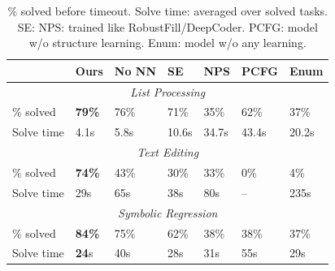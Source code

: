 \documentclass{article}
\newcommand{\expect}{\mathds{E}} %
\newcommand{\probability}{\mathds{P}} %
\begin{document}
\begin{table}
\tabcolsep=4pt
\renewcommand{\arraystretch}{0.5}
\begin{tabular}{lllllll}
  \toprule& Ours& 
    No NN
& SE&NPS & PCFG & Enum



  \\\midrule\multicolumn{7}{c}{\emph{List Processing}}\\\midrule
  \% solved&\textbf{79\%} &76\% &71\%&35\%&62\%&37\%\\
  Solve time&  4.1s&5.8s&10.6s&34.7s&43.4s&20.2s

  \\\midrule\multicolumn{7}{c}{\emph{Text Editing}}\\\midrule
  \% solved&\textbf{74\%} &43\% &30\%&33\%&0\%&4\%\\
  Solve time&  29s&65s&38s&80s&--&235s


  \\\midrule\multicolumn{7}{c}{\emph{Symbolic Regression}}\\\midrule
  \% solved&   \textbf{84\% }&75\%&62\%&38\%&38\%&37\% \\
  Solve time&  \textbf{24}s& 40s  &28s&31s&55s&29s

  \\\bottomrule
  \end{tabular}
\caption{\% solved before timeout. Solve time: averaged over solved
  tasks.  SE: NPS: trained like RobustFill/DeepCoder.  PCFG: model w/o
  structure learning.  Enum: model w/o any learning.  %
}\vspace{-0.5cm}\label{baselineComparisons} \end{table}
\end{document}
